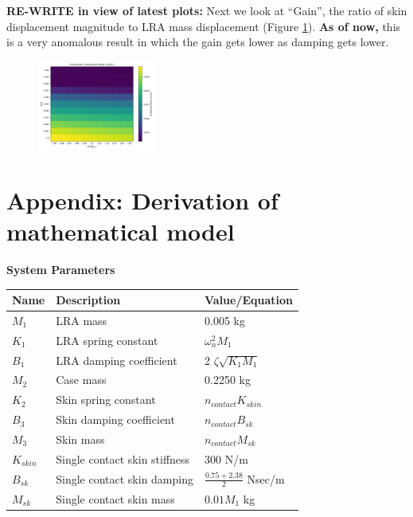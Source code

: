 \documentclass[letterpaper,11pt]{article}
\begin{document}
{\bf RE-WRITE in view of latest plots: }
Next we look at ``Gain'', the ratio of skin displacement magnitude to LRA mass displacement
(Figure \ref{GainFig}).  {\bf As of now,} this is a very anomalous result in which the
gain gets lower as damping gets lower.


\begin{figure}
\includegraphics[width=0.35\textwidth]{heatmap_gain_11x11.png}
\caption{}\label{GainFig}
\end{figure}



\clearpage
\newpage\section*{Appendix: Derivation of mathematical model}
\noindent \textbf{System Parameters}

\begin{table}[h]
\centering
\begin{tabular}{|l|l|l|}
\hline
\textbf{Name} & \textbf{Description} & \textbf{Value/Equation} \\
\hline
$M_1$ & LRA mass & 0.005 kg \\
\hline
$K_1$ & LRA spring constant & $\omega_n^2 M_1$\\
\hline
$B_1$ & LRA damping coefficient & 2 $\zeta   \sqrt{K_1 M_1}$ \\
\hline
$M_2$ & Case mass & 0.2250 kg \\
\hline
$K_2$ & Skin spring constant & $n_{contact}   K_{skin}$ \\
\hline
$B_3$ & Skin damping coefficient & $n_{contact}   B_{sk}$ \\
\hline
$M_3$ & Skin mass & $n_{contact}   M_{sk}$ \\
\hline
$K_{skin}$ & Single contact skin stiffness & 300 N/m \\
\hline
$B_{sk}$ & Single contact skin damping & $\frac{0.75 + 2.38}{2}$ Nsec/m \\
\hline
$M_{sk}$ & Single contact skin mass & $0.01M_1$ kg \\
\hline
\end{tabular}
\end{table}
\end{document}
